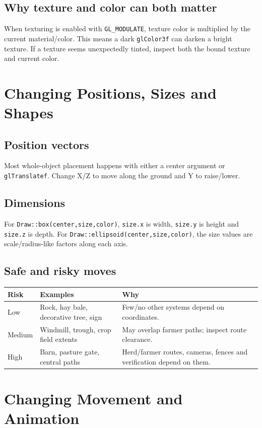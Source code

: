 \documentclass[11pt,a4paper,openany]{book}
\newcommand{\code}[1]{\texttt{#1}}
\begin{document}
\section{Why texture and color can both matter}
When texturing is enabled with \code{GL\_MODULATE}, texture color is multiplied by the current material/color. This means a dark \code{glColor3f} can darken a bright texture. If a texture seems unexpectedly tinted, inspect both the bound texture and current color.

\chapter{Changing Positions, Sizes and Shapes}
\section{Position vectors}
Most whole-object placement happens with either a center argument or \code{glTranslatef}. Change X/Z to move along the ground and Y to raise/lower.

\section{Dimensions}
For \code{Draw::box(center,size,color)}, \code{size.x} is width, \code{size.y} is height and \code{size.z} is depth. For \code{Draw::ellipsoid(center,size,color)}, the size values are scale/radius-like factors along each axis.

\section{Safe and risky moves}
\begin{tabularx}{\textwidth}{@{}lXX@{}}
	\toprule
	Risk   & Examples                              & Why                                                                \\
	\midrule
	Low    & Rock, hay bale, decorative tree, sign & Few/no other systems depend on coordinates.                        \\
	Medium & Windmill, trough, crop field extents  & May overlap farmer paths; inspect route clearance.                       \\
	High   & Barn, pasture gate, central paths     & Herd/farmer routes, cameras, fences and verification depend on them. \\
	\bottomrule
\end{tabularx}

\chapter{Changing Movement and Animation}
\end{document}
